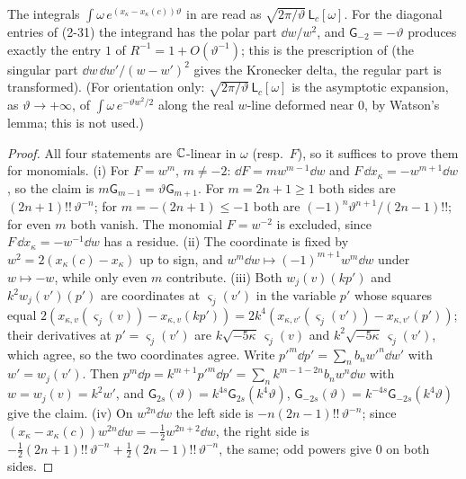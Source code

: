 The integrals $\int\omega\,e^{(x_\kappa-x_\kappa(c))\vartheta}$ in \cite[(2-31), (2-32)]{Dunin-Barkowski:2015caa} are read as $\sqrt{2\pi/\vartheta}\,\mathsf L_c[\omega]$. For the diagonal entries of (2-31) the integrand has the polar part $\dd w/w^2$, and $\mathsf G_{-2}=-\vartheta$ produces exactly the entry $1$ of $R^{-1}=1+O(\vartheta^{-1})$; this is the prescription of \cite[\S3.1, \S3.5]{DuninBarkowski:2012bw} (the singular part $\dd w\,\dd w'/(w-w')^2$ gives the Kronecker delta, the regular part is transformed). (For orientation only: $\sqrt{2\pi/\vartheta}\,\mathsf L_c[\omega]$ is the asymptotic expansion, as $\vartheta\to+\infty$, of $\int\omega\,e^{-\vartheta w^2/2}$ along the real $w$-line deformed near $0$, by Watson's lemma; this is not used.)

\begin{proof}
All four statements are $\mathbb{C}$-linear in $\omega$ (resp.\ $F$), so it suffices to prove them for monomials. (i) For $F=w^m$, $m\neq -2$: $\dd F=mw^{m-1}\dd w$ and $F\,\dd x_\kappa=-w^{m+1}\dd w$, so the claim is $m\mathsf G_{m-1}=\vartheta\mathsf G_{m+1}$. For $m=2n+1\geq 1$ both sides are $(2n+1)!!\,\vartheta^{-n}$; for $m=-(2n+1)\leq -1$ both are $(-1)^n\vartheta^{n+1}/(2n-1)!!$; for even $m$ both vanish. The monomial $F=w^{-2}$ is excluded, since $F\,\dd x_\kappa=-w^{-1}\dd w$ has a residue. (ii) The coordinate is fixed by $w^2=2(x_\kappa(c)-x_\kappa)$ up to sign, and $w^m\dd w\mapsto(-1)^{m+1}w^m\dd w$ under $w\mapsto -w$, while only even $m$ contribute. (iii) Both $w_j(v)(kp')$ and $k^2w_j(v')(p')$ are coordinates at $\varsigma_j(v')$ in the variable $p'$ whose squares equal $2(x_{\kappa,v}(\varsigma_j(v))-x_{\kappa,v}(kp'))=2k^4(x_{\kappa,v'}(\varsigma_j(v'))-x_{\kappa,v'}(p'))$; their derivatives at $p'=\varsigma_j(v')$ are $k\sqrt{-5\kappa}\,\varsigma_j(v)$ and $k^2\sqrt{-5\kappa}\,\varsigma_j(v')$, which agree, so the two coordinates agree. Write $p'^m\dd p'=\sum_nb_nw'^n\dd w'$ with $w'=w_j(v')$. Then $p^m\dd p=k^{m+1}p'^m\dd p'=\sum_nk^{m-1-2n}b_nw^n\dd w$ with $w=w_j(v)=k^2w'$, and $\mathsf G_{2s}(\vartheta)=k^{4s}\mathsf G_{2s}(k^4\vartheta)$, $\mathsf G_{-2s}(\vartheta)=k^{-4s}\mathsf G_{-2s}(k^4\vartheta)$ give the claim. (iv) On $w^{2n}\dd w$ the left side is $-n(2n-1)!!\,\vartheta^{-n}$; since $(x_\kappa-x_\kappa(c))w^{2n}\dd w=-\frac12w^{2n+2}\dd w$, the right side is $-\frac12(2n+1)!!\,\vartheta^{-n}+\frac12(2n-1)!!\,\vartheta^{-n}$, the same; odd powers give $0$ on both sides.
\end{proof}

